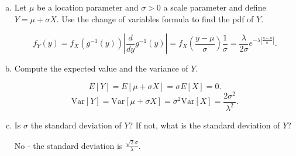 \documentclass[letterpaper,12pt,fleqn]{article}
\begin{document}
\begin{enumerate}
\begin{enumerate}[a)]
\item Let $\mu$ be a location parameter and $\sigma > 0$ a scale parameter and define $Y = \mu + \sigma X$.  Use the change of variables formula to find the pdf of $Y$.

$$f_Y(y) = f_X(g^{-1}(y))|\frac{d}{dy}g^{-1}(y)|=f_X(\frac{y-\mu}{\sigma})\frac{1}{\sigma} = \frac{\lambda}{2\sigma} e^{-\lambda |\frac{y-\mu}{\sigma}|}.$$

\item Compute the expected value and the variance of $Y$.

$$E[Y] = E[\mu + \sigma X] = \sigma E[X] = 0.$$
$$\text{Var}[Y] = \text{Var}[\mu + \sigma X] = \sigma^2 \text{Var}[X] = \frac{2\sigma^2}{\lambda^2}.$$

\item Is $\sigma$ the standard deviation of $Y$?  If not, what is the standard deviation of $Y$?

No - the standard deviation is $\frac{\sqrt{2}\sigma}{\lambda}$.
\end{enumerate}

\end{enumerate}
\end{document}
